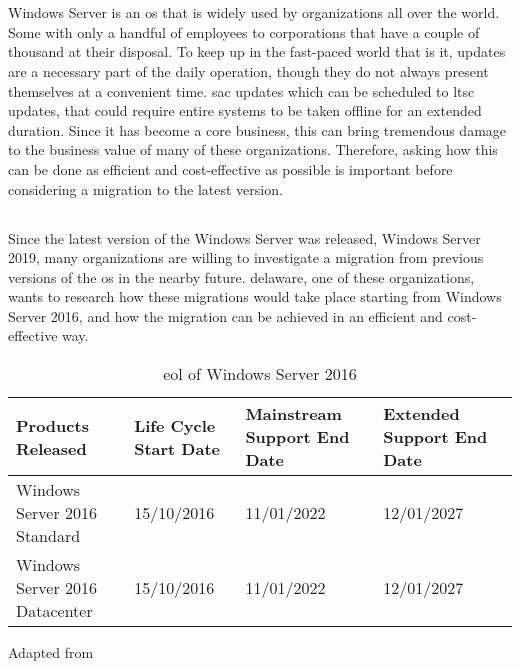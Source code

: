 \chapter{}
\label{ch:inleiding}
Windows Server is an \acrfull{os} that is widely used by organizations all over the world. 
Some with only a handful of employees to corporations that have a couple of thousand at their disposal. 
To keep up in the fast-paced world that is \acrfull{it}, updates are a necessary part of the daily operation, though they do not always present themselves at a convenient time. 
\acrfull{sac} updates which can be scheduled to \acrfull{ltsc} updates, that could require entire systems to be taken offline for an extended duration. 
Since \acrshort{it} has become a core business, this can bring tremendous damage to the business value of many of these organizations.
Therefore, asking how this can be done as efficient and cost-effective as possible is important before considering a migration to the latest version. 

\section{}
\label{sec:probleemstelling}
Since the latest version of the Windows Server was released, Windows Server 2019, many organizations are willing to investigate a migration from previous versions of the \acrshort{os} in the nearby future. 
delaware, one of these organizations, wants to research how these migrations would take place starting from Windows Server 2016, and how the migration can be achieved in an efficient and cost-effective way. 

\begin{table}[htb!]
	\centering
	\begin{adjustbox}{width=1\textwidth}
		\begin{tabular}{l|l|l|ll}
			Products Released & Life Cycle Start Date & Mainstream Support End Date & Extended Support End Date &\\
			\hline
			Windows Server 2016 Standard & 15/10/2016 & 11/01/2022 & 12/01/2027 &\\
			Windows Server 2016 Datacenter & 15/10/2016 & 11/01/2022 & 12/01/2027 &\\
		\end{tabular}
	\end{adjustbox}
	\caption[\acrshort{eol} \acrshort{ws}2016]{\acrshort{eol} of Windows Server 2016}
	\scriptsize	
	Adapted from \cite{MicrosoftEOL2019}
	\label{tab:EOL2016}
\end{table}

